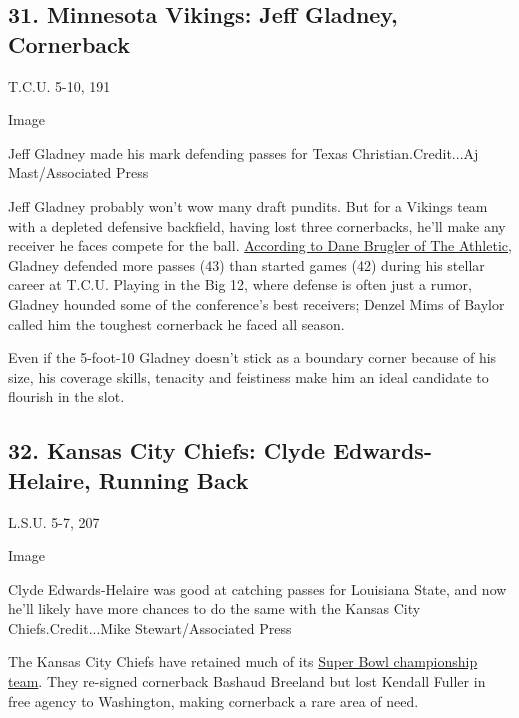 \hypertarget{31-minnesota-vikings-jeff-gladney-cornerback}{%
\subsection{31. Minnesota Vikings: Jeff Gladney,
Cornerback}\label{31-minnesota-vikings-jeff-gladney-cornerback}}

T.C.U. 5-10, 191

Image

Jeff Gladney made his mark defending passes for Texas
Christian.Credit...Aj Mast/Associated Press

Jeff Gladney probably won't wow many draft pundits. But for a Vikings
team with a depleted defensive backfield, having lost three cornerbacks,
he'll make any receiver he faces compete for the ball.
\href{https://theathletic.com/1648084/2020/03/02/draft-expert-dane-brugler-breaks-down-cowboys-best-case-scenario-sleepers/}{According
to Dane Brugler of The Athletic}, Gladney defended more passes (43) than
started games (42) during his stellar career at T.C.U. Playing in the
Big 12, where defense is often just a rumor, Gladney hounded some of the
conference's best receivers; Denzel Mims of Baylor called him the
toughest cornerback he faced all season.

Even if the 5-foot-10 Gladney doesn't stick as a boundary corner because
of his size, his coverage skills, tenacity and feistiness make him an
ideal candidate to flourish in the slot.

\hypertarget{32-kansas-city-chiefs-clyde-edwards-helaire-running-back}{%
\subsection{32. Kansas City Chiefs: Clyde Edwards-Helaire, Running
Back}\label{32-kansas-city-chiefs-clyde-edwards-helaire-running-back}}

L.S.U. 5-7, 207

Image

Clyde Edwards-Helaire was good at catching passes for Louisiana State,
and now he'll likely have more chances to do the same with the Kansas
City Chiefs.Credit...Mike Stewart/Associated Press

The Kansas City Chiefs have retained much of its
\href{https://www.nytimes3xbfgragh.onion/2020/02/03/sports/football/chiefs-super-bowl-champions.html}{Super
Bowl championship team}. They re-signed cornerback Bashaud Breeland but
lost Kendall Fuller in free agency to Washington, making cornerback a
rare area of need.

